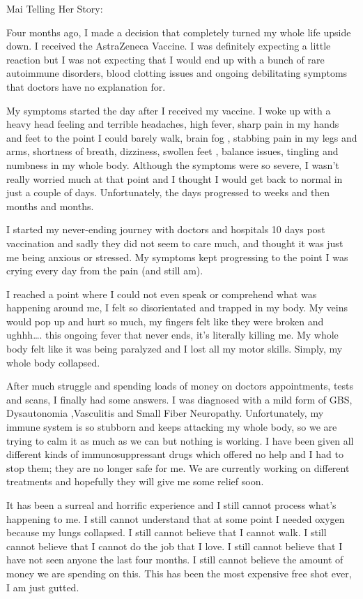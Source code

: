 Mai Telling Her Story:

Four months ago, I made a decision that completely turned my whole life upside
down. I received the AstraZeneca Vaccine. I was definitely expecting a little
reaction but I was not expecting that I would end up with a bunch of rare
autoimmune disorders, blood clotting issues and ongoing debilitating symptoms
that doctors have no explanation for.

My symptoms started the day after I received my vaccine. I woke up with a heavy
head feeling and terrible headaches, high fever, sharp pain in my hands and feet
to the point I could barely walk, brain fog , stabbing pain in my legs and arms,
shortness of breath, dizziness, swollen feet , balance issues, tingling and
numbness in my whole body. Although the symptoms were so severe, I wasn’t really
worried much at that point and I thought I would get back to normal in just a
couple of days. Unfortunately, the days progressed to weeks and then months and
months.

I started my never-ending journey with doctors and hospitals 10 days post vaccination and sadly they did not seem to care much, and thought it was just me being anxious or stressed. My symptoms kept progressing to the point I was crying every day from the pain (and still am).

I reached a point where I could not even speak or comprehend what was happening
around me, I felt so disorientated and trapped in my body. My veins would pop up
and hurt so much, my fingers felt like they were broken and ughhh…. this ongoing
fever that never ends, it’s literally killing me. My whole body felt like it was
being paralyzed and I lost all my motor skills. Simply, my whole body collapsed.

After much struggle and spending loads of money on doctors appointments, tests
and scans, I finally had some answers. I was diagnosed with a mild form of GBS,
Dysautonomia ,Vasculitis and Small Fiber Neuropathy. Unfortunately, my immune
system is so stubborn and keeps attacking my whole body, so we are trying to
calm it as much as we can but nothing is working. I have been given all
different kinds of immunosuppressant drugs which offered no help and I had to
stop them; they are no longer safe for me. We are currently working on different
treatments and hopefully they will give me some relief soon.

It has been a surreal and horrific experience and I still cannot process what’s
happening to me. I still cannot understand that at some point I needed oxygen
because my lungs collapsed. I still cannot believe that I cannot walk. I still
cannot believe that I cannot do the job that I love. I still cannot believe that
I have not seen anyone the last four months. I still cannot believe the amount
of money we are spending on this. This has been the most expensive free shot
ever, I am just gutted.

